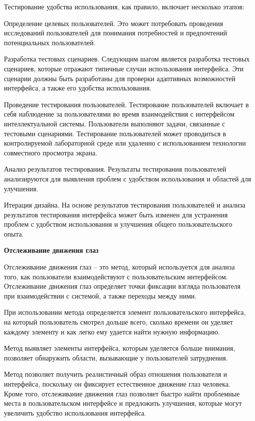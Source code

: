 Тестирование удобства использования, как правило, включает несколько этапов:

\begin{textitemize}
	\item Определение целевых пользователей. Это может потребовать проведения исследований пользователей для понимания потребностей и предпочтений потенциальных пользователей.
	\item Разработка тестовых сценариев. Следующим шагом является разработка тестовых сценариев, которые отражают типичные случаи использования интерфейса. Эти сценарии должны быть разработаны для проверки адаптивных возможностей интерфейса, а также его удобства использования.
	\item Проведение тестирования пользователей. Тестирование пользователей включает в себя наблюдение за пользователями во время взаимодействия с интерфейсом интеллектуальной системы. Пользователи выполняют задачи, связанные с тестовыми сценариями. Тестирование пользователей может проводиться в контролируемой лабораторной среде или удаленно с использованием технологии совместного просмотра экрана.
	\item Анализ результатов тестирования. Результаты тестирования пользователей анализируются для выявления проблем с удобством использования и областей для улучшения.
	\item Итерация дизайна. На основе результатов тестирования пользователей и анализа результатов тестирования интерфейса может быть изменен для устранения проблем с удобством использования и улучшения общего пользовательского опыта.
\end{textitemize}


\textbf{Отслеживание движения глаз} 


Отслеживание движения глаз – это метод, который используется для анализа того, как пользователи взаимодействуют с пользовательским интерфейсом. Отслеживание движения глаз определяет точки фиксации взгляда пользователя при взаимодействии с системой, а также переходы между ними. 

При использовании метода определяется элемент пользовательского интерфейса, на который пользователь смотрел дольше всего, сколько времени он уделяет каждому элементу и как легко ему удается найти нужную информацию.

Метод выявляет элементы интерфейса, которым уделяется больше внимания, позволяет обнаружить области, вызывающие у пользователей затруднения.

Метод позволяет получить реалистичный образ отношения пользователя и интерфейса, поскольку он фиксирует естественное движение глаз человека. Кроме того, отслеживание движения глаз позволяет быстро найти проблемные места в пользовательском интерфейсе и предложить улучшения, которые могут увеличить удобство использования интерфейса.


